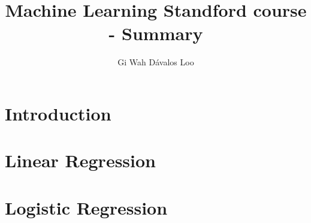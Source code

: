 \documentclass[12pt,a4paper]{article}
\title{Machine Learning Standford course - Summary}
\author{Gi Wah Dávalos Loo}
\begin{document}
\maketitle


\section{Introduction}


\section{Linear Regression}


\section{Logistic Regression}

\end{document}
